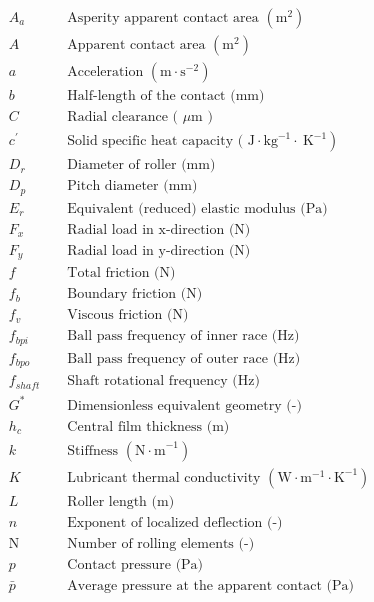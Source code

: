 \begin{align*}
	&A_a && \text { Asperity apparent contact area }\left(\mathrm{m}^2\right) \\
	&A && \text { Apparent contact area }\left(\mathrm{m}^2\right) \\
	&a && \text { Acceleration }\left(\mathrm{m \cdot s}^{-2}\right) \\
	&b && \text { Half-length of the contact (mm) } \\
	&C && \text { Radial clearance ( } \mu \mathrm{m} \text { ) } \\
	&c^{\prime} && \text { Solid specific heat capacity ( } \left.\mathrm{J} \cdot \mathrm{kg}^{-1} \cdot \mathrm{~K}^{-1}\right) \\
	&D_r && \text { Diameter of roller (mm) } \\
	&D_p && \text { Pitch diameter (mm) } \\
	&E_r && \text { Equivalent (reduced) elastic modulus (Pa) } \\
	&F_x && \text { Radial load in x-direction (N) } \\
	&F_y && \text { Radial load in y-direction (N) } \\
	&f && \text { Total friction (N) } \\
	&f_b && \text { Boundary friction (N) } \\
	&f_v && \text { Viscous friction (N) } \\
	&f_{b p i} && \text { Ball pass frequency of inner race (Hz) } \\
	&f_{b p o} && \text { Ball pass frequency of outer race (Hz) } \\
	&f_{s h a f t} && \text { Shaft rotational frequency (Hz) } \\
	&G^* && \text { Dimensionless equivalent geometry (-) } \\
	&h_c && \text { Central film thickness (m) } \\
	&k && \text { Stiffness }\left(\mathrm{N \cdot m}^{-1}\right) \\
	&K && \text { Lubricant thermal conductivity } \left(\mathrm{W} \cdot \mathrm{m}^{-1} \cdot \mathrm{K}^{-1}\right) \\
	&L && \text { Roller length (m) } \\
	&n && \text { Exponent of localized deflection (-) } \\
	&\mathrm{N} && \text { Number of rolling elements (-) } \\
	&p && \text { Contact pressure (Pa) } \\
	&\bar{p} && \text { Average pressure at the apparent contact (Pa) } \\

\end{align*}
